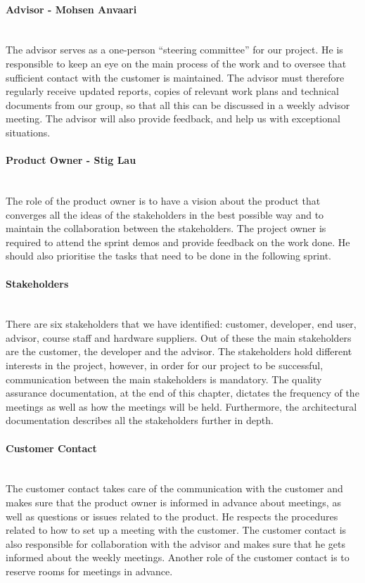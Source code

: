 \documentclass[../document.tex]{subfiles}
\begin{document}
\paragraph{Advisor - Mohsen Anvaari} \ \\
The advisor serves as a one-person “steering committee” for our project. He is responsible to keep an eye on the main process of the work and to oversee that sufficient contact with the customer is maintained. The advisor must therefore regularly receive updated reports, copies of relevant work plans and technical documents from our group, so that all this can be discussed in a weekly advisor meeting. The advisor will also provide feedback, and help us with exceptional situations.


\paragraph{Product Owner - Stig Lau} \ \\
The role of the product owner is to have a vision about the product that converges all the ideas of the stakeholders in the best possible way and to maintain the collaboration between the stakeholders. The project owner is required to attend the sprint demos and provide feedback on the work done. He should also prioritise the tasks that need to be done in the following sprint. 

\paragraph{Stakeholders} \ \\
There are six stakeholders that we have identified: customer, developer, end user, advisor, course staff and hardware suppliers. Out of these the main stakeholders are the customer, the developer and the advisor. The stakeholders hold different interests in the project, however, in order for our project to be successful, communication between the main stakeholders is mandatory. The quality assurance documentation, at the end of this chapter, dictates the frequency of the meetings as well as how the meetings will be held. Furthermore, the architectural documentation describes all the stakeholders further in depth.

\paragraph{Customer Contact} \ \\
The customer contact takes care of the communication with the customer and makes sure that the product owner is informed in advance about meetings, as well as questions or issues related to the product. He respects the procedures related to how to set up a meeting with the customer. The customer contact is also responsible for collaboration with the advisor and makes sure that he gets informed about the weekly meetings. Another role of the customer contact is to reserve rooms for meetings in advance.
\end{document}
